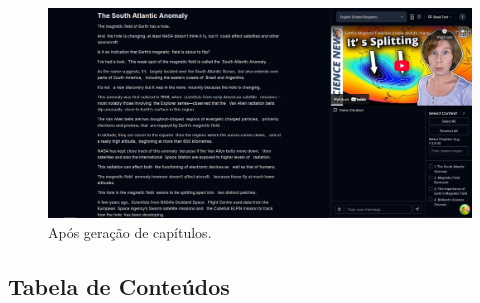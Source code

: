 \documentclass[tcc,capa]{texufpel}
\begin{document}
\begin{figure}[H]
  \centering
  \includegraphics[width=\textwidth,height=0.45\textheight,keepaspectratio]{exemplo-slides/graphics/images/after-chapter-generation.png}
  \caption{Após geração de capítulos.}
  \label{fig:generate_chapters_after}
\end{figure}






\subsection{Tabela de Conteúdos}
\end{document}
